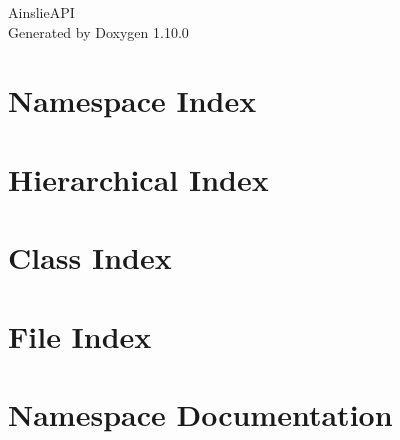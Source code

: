 \documentclass[twoside]{book}
\newcommand{\+}{\discretionary{\mbox{\scriptsize$\hookleftarrow$}}{}{}}
\newcommand{\clearemptydoublepage}{%
    \newpage{\pagestyle{empty}\cleardoublepage}%
  }
\begin{document}
  \raggedbottom
    \hypersetup{pageanchor=false,
                bookmarksnumbered=true,
                pdfencoding=unicode
               }
  \begin{titlepage}
  \vspace*{7cm}
  \begin{center}%
  {\Large Ainslie\+API}\\
  \vspace*{1cm}
  {\large Generated by Doxygen 1.10.0}\\
  \end{center}
  \end{titlepage}
  \clearemptydoublepage
  \tableofcontents
  \clearemptydoublepage
  \hypersetup{pageanchor=true}

\chapter{Namespace Index}

\chapter{Hierarchical Index}

\chapter{Class Index}

\chapter{File Index}

\chapter{Namespace Documentation}

























\end{document}
